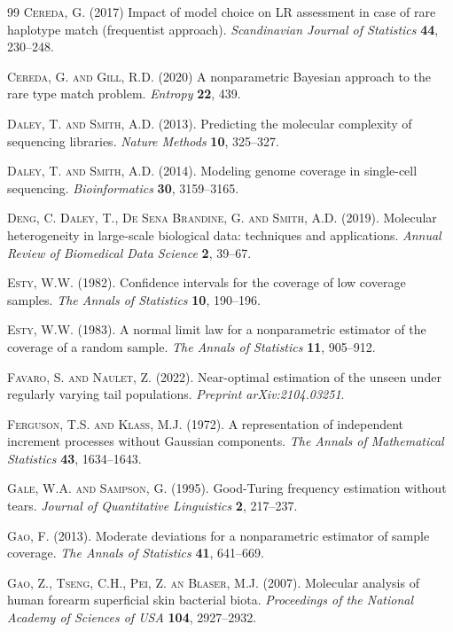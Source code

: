 \documentclass{article}
\newcommand{\1}{\boldsymbol{1}}
\theoremstyle{plain}
\begin{document}
\begin{thebibliography}{99}
\textsc{Cereda, G.} (2017) Impact of model choice on LR assessment in case of rare haplotype match (frequentist approach). \textit{Scandinavian Journal of Statistics} \textbf{44}, 230--248.

\textsc{Cereda, G. and Gill, R.D.} (2020) A nonparametric Bayesian approach to the rare type match problem. \textit{Entropy} \textbf{22}, 439.

\textsc{Daley, T. and Smith, A.D.} (2013). Predicting the molecular complexity of sequencing libraries. \textit{Nature Methods} \textbf{10}, 325--327.

\textsc{Daley, T. and Smith, A.D.} (2014). Modeling genome coverage in single-cell sequencing. \textit{Bioinformatics} \textbf{30}, 3159--3165.

\textsc{Deng, C. Daley, T., De Sena Brandine, G. and Smith, A.D.} (2019). Molecular heterogeneity in large-scale biological data: techniques and applications. \textit{Annual Review of Biomedical Data Science} \textbf{2}, 39--67.

\textsc{Esty, W.W.} (1982). Confidence intervals for the coverage of low coverage samples. \textit{The Annals of Statistics} \textbf{10}, 190--196.

\textsc{Esty, W.W.} (1983). A normal limit law for a nonparametric estimator of the coverage of a random sample. \textit{The Annals of Statistics} \textbf{11}, 905--912.

\textsc{Favaro, S. and Naulet, Z.} (2022). Near-optimal estimation of the unseen under regularly varying tail populations. \textit{Preprint arXiv:2104.03251}.

\textsc{Ferguson, T.S. and Klass, M.J.} (1972). A representation of independent increment processes without Gaussian components. \textit{The Annals of Mathematical Statistics} \textbf{43}, 1634--1643.

\textsc{Gale, W.A. and Sampson, G.} (1995). Good-Turing frequency estimation without tears. \textit{Journal of Quantitative Linguistics} \textbf{2}, 217--237.

\textsc{Gao, F.} (2013). Moderate deviations for a nonparametric estimator of sample coverage. \textit{The Annals of Statistics} \textbf{41}, 641--669. 

\textsc{Gao, Z., Tseng, C.H., Pei, Z. an Blaser, M.J.} (2007). Molecular analysis of human forearm superficial skin bacterial biota. \textit{Proceedings of the National Academy of Sciences of USA} \textbf{104}, 2927--2932.


\end{thebibliography}
\end{document}
